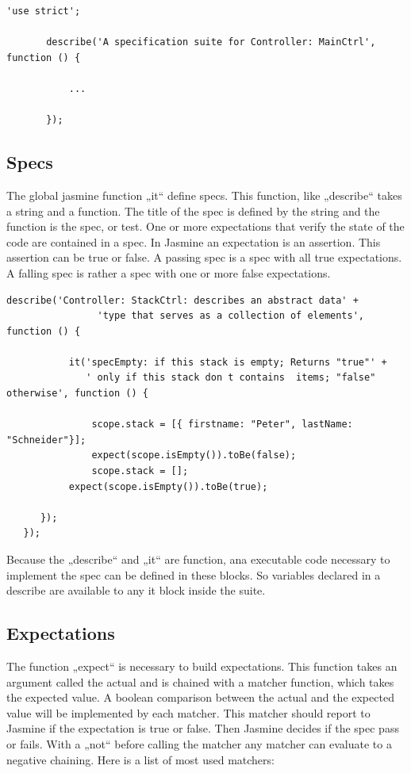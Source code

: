 \documentclass[11pt]{article}
\begin{document}
\begin{lstlisting}[caption=Suites example]
       'use strict';  
         
       describe('A specification suite for Controller: MainCtrl', function () {  
         
           ...  
         
       });  
\end{lstlisting}

\subsection{Specs}

The global jasmine function „it“ define specs. This function, like „describe“ takes a string and a function. The title of the spec is defined by the string and the function is the spec, or test. One or more expectations that verify the state of the code are contained in a spec. In Jasmine an expectation is an assertion. This assertion can be true or false. A passing spec is a spec with all true expectations. A falling spec is rather a spec with one or more false expectations. 

\begin{lstlisting}[caption=Specs example]
       describe('Controller: StackCtrl: describes an abstract data' +  
                'type that serves as a collection of elements', function () {  
            
           it('specEmpty: if this stack is empty; Returns "true"' +  
              ' only if this stack don t contains  items; "false" otherwise', function () {  
         
               scope.stack = [{ firstname: "Peter", lastName: "Schneider"}];  
               expect(scope.isEmpty()).toBe(false);  
               scope.stack = [];  
           expect(scope.isEmpty()).toBe(true);      
         
      });  
   });  
\end{lstlisting}

Because the „describe“ and „it“ are function, ana executable code necessary to implement the spec can be defined in these blocks. So variables declared in a describe are available to any it block inside the suite.

\subsection{Expectations}

The function „expect“ is necessary to build expectations. This function takes an argument called the actual and is chained with a matcher function, which takes the expected value. A boolean comparison between the actual and the expected value will be implemented by each matcher. This matcher should report to Jasmine if the expectation is true or false. Then Jasmine decides if the spec pass or fails. With a „not“ before calling the matcher any matcher can evaluate to a negative chaining. Here is a list of most used matchers:
\end{document}
